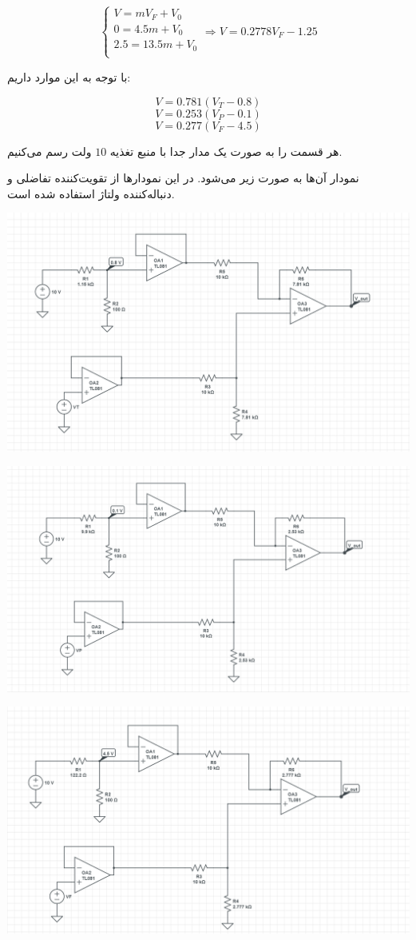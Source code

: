 \documentclass[12pt]{article}
\begin{document}
$$\left\{\begin{array}{c}
	V = m V_F + V_0\\
	0 = 4.5 m + V_0\\
	2.5 = 13.5 m + V_0\\
\end{array}\right. \Rightarrow V=0.2778V_F - 1.25$$


با توجه به این موارد داریم:

$$V=0.781 (V_T - 0.8)$$
$$V=0.253(V_P - 0.1)$$
$$V=0.277(V_F -4.5)$$

هر قسمت را به صورت یک مدار جدا با منبع تغذیه $10$ ولت رسم می‌کنیم.

نمودار آن‌ها به صورت زیر می‌شود. در این نمودارها از تقویت‌کننده تفاضلی و دنباله‌کننده ولتاژ استفاده شده است.


\begin{center}
	\includegraphics[width = 0.5 \textwidth]{images/2.png}
\end{center}

\begin{center}
	\includegraphics[width = 0.5 \textwidth]{images/3.png}
\end{center}

\begin{center}
	\includegraphics[width = 0.5 \textwidth]{images/4.png}
\end{center}
\end{document}
